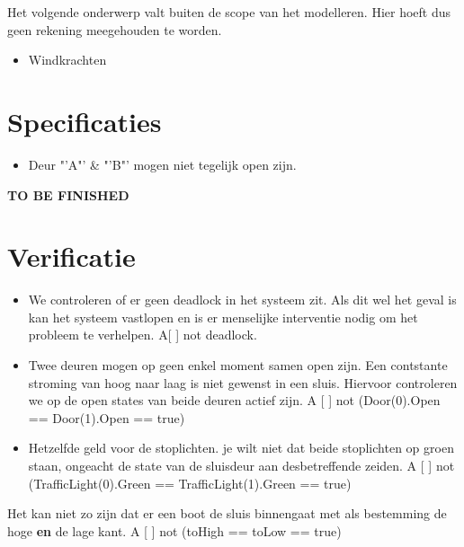 \documentclass{article}
\begin{document}
Het volgende onderwerp valt buiten de scope van het modelleren. Hier hoeft dus geen rekening meegehouden te worden.
\begin{itemize}
\item Windkrachten
\end{itemize}

\section{Specificaties} %

\begin{itemize}
\item Deur "'A"' \& "'B"' mogen niet tegelijk open zijn.
\end{itemize}

\vskip2cm
{\Huge\color{red} \textbf{TO BE FINISHED}}

\clearpage %
\section{Verificatie}
\begin{itemize}
\item We controleren of er geen deadlock in het systeem zit. Als dit wel het geval is kan het systeem vastlopen en is er menselijke interventie nodig om het probleem te verhelpen.
{\center A[ ] not deadlock.\\}
\vskip0.5cm

\item Twee deuren mogen op geen enkel moment samen open zijn. Een contstante stroming van hoog naar laag is niet gewenst in een sluis. Hiervoor controleren we op de open states van beide deuren actief zijn.
{\center A [ ] not (Door(0).Open == Door(1).Open == true)\\} %
\vskip0.5cm

\item Hetzelfde geld voor de stoplichten. je wilt niet dat beide stoplichten op groen staan, ongeacht de state van de sluisdeur aan desbetreffende zeiden.
{\center A [ ] not (TrafficLight(0).Green == TrafficLight(1).Green == true)\\}
\end{itemize}

Het kan niet zo zijn dat er een boot de sluis binnengaat met als bestemming de hoge \textbf{en} de lage kant.
{\center A [ ] not (toHigh == toLow == true)\\}
\end{document}
